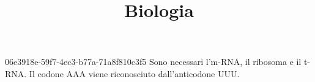 \documentclass[preview]{standalone}
\begin{document}
\title{Biologia}
\genpage

\begin{snippet}{06e3918e-59f7-4ec3-b77a-71a8f810c3f5}
    Sono necessari l'm-RNA, il ribosoma e il t-RNA.
    Il codone AAA viene riconosciuto dall'anticodone UUU.
\end{snippet}
\end{document}
